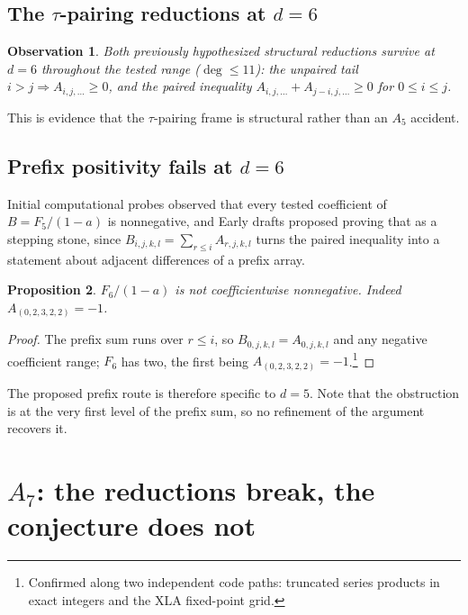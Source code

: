 \documentclass[11pt,a4paper]{article}
\theoremstyle{plain}
\newtheorem{proposition}{Proposition}
\newtheorem{observation}[proposition]{Observation}
\theoremstyle{definition}
\theoremstyle{remark}
\begin{document}
\subsection{The $\tau$-pairing reductions at \texorpdfstring{$d = 6$}{d = 6}}

\begin{observation}
Both previously hypothesized structural reductions survive at $d = 6$ throughout the tested range ($\deg \le 11$): the
unpaired tail $i > j \Rightarrow A_{i,j,\dots} \ge 0$, and the paired inequality
$A_{i,j,\dots} + A_{j-i,j,\dots} \ge 0$ for $0 \le i \le j$.
\end{observation}

This is evidence that the $\tau$-pairing frame is structural rather than an $A_5$ accident.

\subsection{Prefix positivity fails at \texorpdfstring{$d = 6$}{d = 6}}
\label{sec:prefix}

Initial computational probes observed that every tested coefficient of $B = F_5/(1-a)$ is nonnegative, and
Early drafts proposed proving that as a stepping stone, since
$B_{i,j,k,l} = \sum_{r \le i} A_{r,j,k,l}$ turns the paired inequality into a statement about
adjacent differences of a prefix array.

\begin{proposition}
$F_6/(1-a)$ is not coefficientwise nonnegative. Indeed $A_{(0,2,3,2,2)} = -1$.
\end{proposition}

\begin{proof}
The prefix sum runs over $r \le i$, so $B_{0,j,k,l} = A_{0,j,k,l}$ and any negative coefficient
range; $F_6$ has two, the first being $A_{(0,2,3,2,2)} = -1$.\footnote{Confirmed along two independent code paths: truncated series products in exact integers and the XLA fixed-point grid.}
\end{proof}

The proposed prefix route is therefore specific to $d = 5$. Note that the obstruction is at the
very first level of the prefix sum, so no refinement of the argument recovers it.

\section{\texorpdfstring{$A_7$}{A\_7}: the reductions break, the conjecture does not}
\label{sec:a7}
\end{document}
